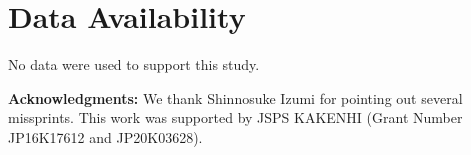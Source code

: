\documentclass[12pt]{article}
\theoremstyle{plain}
\newtheorem{prop}[theorem]{\bf Proposition}
\numberwithin{equation}{section}
\theoremstyle{remark}
\begin{document}
\begin{comment}
\begin{prop}
Suppose (B1)--(B5).
We further suppose that $g_n=0$ for all sufficiently large $n\in\NN$.
Then the following are equivalent.
\begin{itemize}{}{}
\item[(1)] $\dom(T^{-3/2})\subset\dom(S^{-3/2})$.
\item[(2)] $\dom(S^{-3/2})\supset\dom(T^{-3/2})$.
\item[(3)] $g_n\in\dom(T^{-1})$ for all $n\in\NN$.
\end{itemize} 
\end{prop}

\begin{proof}
The implications (3) $\Rightarrow$ (1) and (3) $\Rightarrow$ (2) follow from Lemma \ref{domain-3/2}.
We next show (1) $\Rightarrow$ (3).
Let $N\in\NN$ be such that $g_n=0$ for all $n\geq N$.
We set
\[
 \sD := \dom(T^2)\cap\dom(T^{-1/2})=\dom(S^2)\cap\dom(S^{-1/2}),
\]
and take an arbitrary $u\in\sD$.
Then we have
\begin{align}
&S^{3/2}u = S^2S^{-1/2}u = \left(T^2+\sum_{n=1}^N\lambda_n\ket{T^{1/2}g_n}\bra{T^{1/2}g_n}\right)S^{-1/2}u\\
&= T^{3/2}\cdot\overline{T^{1/2}S^{-1/2}}u+\sum_{n=1}^N\lambda_n\left\langle \overline{S^{-1/2}T^{1/2}}g_n,u\right\rangle T^{1/2}g_n
\end{align}
\end{proof}
\end{comment}


\section*{Data Availability}
No data were used to support this study.



\vspace*{10pt}
\noindent\textbf{Acknowledgments:}
We thank Shinnosuke Izumi for pointing out several missprints.
This work was supported by JSPS KAKENHI (Grant Number JP16K17612 and JP20K03628).
\end{document}
